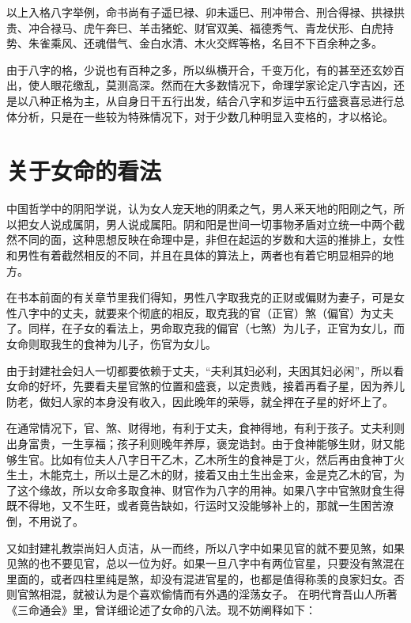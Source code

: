 \documentclass[a5paper,oneside,12pt]{ctexbook}
\begin{document}
以上入格八字举例，命书尚有子遥巳禄、卯未遥巳、刑冲带合、刑合得禄、拱禄拱贵、冲合禄马、虎午奔巳、羊击猪蛇、财官双美、福德秀气、青龙伏形、白虎持势、朱雀乘风、还魂借气、金白水清、木火交辉等格，名目不下百余种之多。

由于八字的格，少说也有百种之多，所以纵横开合，千变万化，有的甚至还玄妙百出，使人眼花缴乱，莫测高深。然而在大多数情况下，命理学家论定八字吉凶，还是以八种正格为主，从自身日干五行出发，结合八字和岁运中五行盛衰喜忌进行总体分析，只是在一些较为特殊情况下，对于少数几种明显入变格的，才以格论。

\section{关于女命的看法}

中国哲学中的阴阳学说，认为女人宠天地的阴柔之气，男人釆天地的阳刚之气，所以把女人说成属阴，男人说成属阳。阴和阳是世间一切事物矛盾对立统一中两个截然不同的面，这种思想反映在命理中是，非但在起运的岁数和大运的推排上，女性和男性有着截然相反的不同，并且在具体的算法上，两者也有着它明显相异的地方。

在书本前面的有关章节里我们得知，男性八字取我克的正财或偏财为妻子，可是女性八字中的丈夫，就要来个彻底的相反，取克我的官（正官）煞（偏官）为丈夫了。同样，在子女的看法上，男命取克我的偏官（七煞）为儿子，正官为女儿，而女命则取我生的食神为儿子，伤官为女儿。

由于封建社会妇人一切都要依赖于丈夫，“夫利其妇必利，夫困其妇必闲”，所以看女命的好坏，先要看夫星官煞的位置和盛衰，以定贵贱，接着再看子星，因为养儿防老，做妇人家的本身没有收入，因此晚年的荣辱，就全押在子星的好坏上了。

在通常情况下，官、煞、财得地，有利于丈夫，食神得地，有利于孩子。丈夫利则出身富贵，一生享福；孩子利则晚年养厚，褒宠诰封。由于食神能够生财，财又能够生官。比如有位夫人八字日干乙木，乙木所生的食神是丁火，然后再由食神丁火生土，木能克土，所以土是乙木的财，接着又由土生出金来，金是克乙木的官，为了这个缘故，所以女命多取食神、财官作为八字的用神。如果八字中官煞财食生得既不得地，又不生旺，或者竟告缺如，行运时又没能够补上的，那就一生困苦潦倒，不用说了。

又如封建礼教崇尚妇人贞洁，从一而终，所以八字中如果见官的就不要见煞，如果见煞的也不要见官，总以一位为好。如果一旦八字中有两位官星，只要没有煞混在里面的，或者四柱里纯是煞，却没有混进官星的，也都是值得称羡的良家妇女。否则官煞相混，就被认为是个喜欢偷情而有外遇的淫荡女子。
在明代育吾山人所著《三命通会》里，曾详细论述了女命的八法。现不妨阐释如下：
\end{document}
